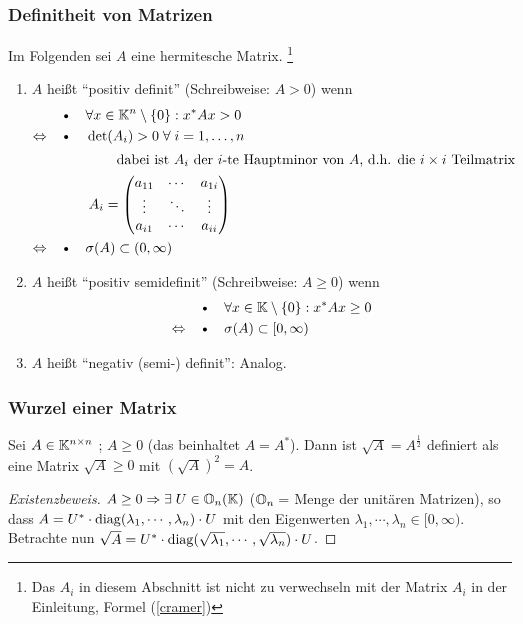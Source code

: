 \subsubsection{Definitheit von Matrizen}
Im Folgenden sei $A$ eine hermitesche Matrix.
\footnote{Das $A_i$ in diesem Abschnitt ist nicht zu verwechseln mit der Matrix $A_i$
in der Einleitung, Formel (\ref{cramer})}
\begin{enumerate}
  \item [a)] $A$ heißt "`positiv definit"' (Schreibweise: $A > 0$) wenn
  \begin{align*}
    &\text{\textbullet} \quad \forall x \in \KK^n \setminus \{0\}: x^* A x > 0 \\
    \Leftrightarrow \quad &\text{\textbullet} \quad \det(A_i) > 0 \; \forall \; i = 1, \dots , n \\
    \intertext{\qquad \qquad \qquad dabei ist $A_i$ der $i$-te Hauptminor
    von $A$, d.h.
    die $i\times i$ Teilmatrix}
    & \quad \quad A_i =
    \begin{pmatrix}
      a_{11} & \cdots  & a_{1i} \\
      \vdots & \ddots & \vdots \\
      a_{i1} & \cdots & a_{ii}
    \end{pmatrix} \\
    \Leftrightarrow \quad &\text{\textbullet} \quad  \sigma (A) \subset (0, \infty)
  \end{align*}
  \item[b)]$A$ heißt "`positiv semidefinit"' (Schreibweise: $A \ge 0$) wenn
    \begin{align*}
    &\text{\textbullet} \quad \forall x \in \KK \setminus \{0\}: x^* A x \ge 0 \\
    \Leftrightarrow \quad &\text{\textbullet} \quad  \sigma (A) \subset [0, \infty)
  \end{align*}
  \item[c)] $A$ heißt "`negativ (semi-) definit"': Analog.
\end{enumerate}

\subsubsection{Wurzel einer Matrix}
Sei $A \in \mathbb K^{n \times n}$ ; $A \ge 0$ (das beinhaltet $A = A^*$). Dann ist
$\sqrt{A} = A^{\frac{1}{2}}$ definiert als eine Matrix $\sqrt{A} \ge 0$ mit
$\left(\sqrt{A} \right)^2 = A$.

\begin{proof}[Existenzbeweis]
$A \ge 0 \Rightarrow \exists \; U \in \mathbb O_n(\mathbb K)$ ($\mathbb O_n = $ Menge
der unitären Matrizen), so dass  \newline
$A = U^* \cdot \operatorname*{\mathrm{diag}}(\lambda_1, \cdots , \lambda_n) \cdot U$ mit den Eigenwerten
$\lambda_1, \cdots , \lambda_n \in [0, \infty)$. \newline
Betrachte nun $\sqrt{A} = U^* \cdot \operatorname*{\mathrm{diag}}(\sqrt{\lambda_1}, \cdots , \sqrt{\lambda_n}) \cdot U$.
\end{proof}

